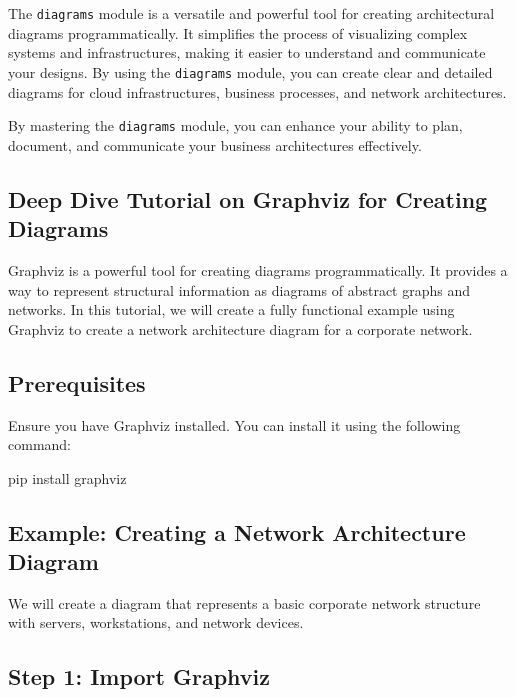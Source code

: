 \documentclass[
  letterpaper,
  DIV=11,
  numbers=noendperiod]{scrreprt}
\newenvironment{Shaded}{\begin{snugshade}}{\end{snugshade}}
\newcommand{\ExtensionTok}[1]{\textcolor[rgb]{0.00,0.23,0.31}{#1}}
\newcommand{\NormalTok}[1]{\textcolor[rgb]{0.00,0.23,0.31}{#1}}
\begin{document}
The \texttt{diagrams} module is a versatile and powerful tool for
creating architectural diagrams programmatically. It simplifies the
process of visualizing complex systems and infrastructures, making it
easier to understand and communicate your designs. By using the
\texttt{diagrams} module, you can create clear and detailed diagrams for
cloud infrastructures, business processes, and network architectures.

By mastering the \texttt{diagrams} module, you can enhance your ability
to plan, document, and communicate your business architectures
effectively.

\subsection{Deep Dive Tutorial on Graphviz for Creating
Diagrams}\label{deep-dive-tutorial-on-graphviz-for-creating-diagrams}

Graphviz is a powerful tool for creating diagrams programmatically. It
provides a way to represent structural information as diagrams of
abstract graphs and networks. In this tutorial, we will create a fully
functional example using Graphviz to create a network architecture
diagram for a corporate network.

\subsection{Prerequisites}\label{prerequisites-1}

Ensure you have Graphviz installed. You can install it using the
following command:

\begin{Shaded}
\begin{Highlighting}[]
\ExtensionTok{pip}\NormalTok{ install graphviz}
\end{Highlighting}
\end{Shaded}

\subsection{Example: Creating a Network Architecture
Diagram}\label{example-creating-a-network-architecture-diagram}

We will create a diagram that represents a basic corporate network
structure with servers, workstations, and network devices.

\subsection{Step 1: Import Graphviz}\label{step-1-import-graphviz}
\end{document}
